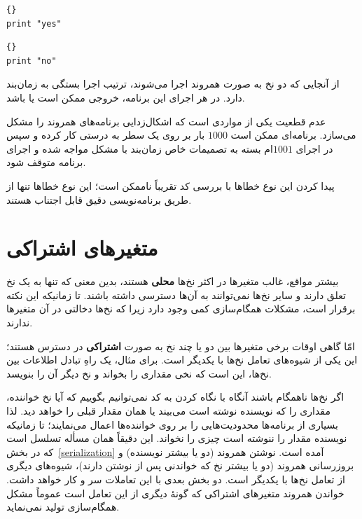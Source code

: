 \documentclass{book}
\begin{document}
\begin{latin}
\begin{minipage}[t]{2in}
\begin{latin}
\begin{lstlisting}[title=\rl{نخ \lr{A}}]{}
print "yes"
\end{lstlisting}
\end{latin}
\end{minipage}
\hfill
\begin{minipage}[t]{2in}
\begin{latin}
\begin{lstlisting}[title=\rl{نخ \lr{‌B}}]{}
print "no"
\end{lstlisting}
\end{latin}
\end{minipage}
\end{latin}

    از آنجایی که دو نخ به صورت همروند اجرا می‌شوند، ترتیب اجرا بستگی به زمان‌بند دارد. در هر اجرای این برنامه، خروجی ممکن است 
      یا 
     باشد. 
     
    عدم قطعیت یکی از مواردی است که اشکال‌زدایی برنامه‌های همروند را مشکل می‌سازد. برنامه‌ای ممکن است $1000$ بار بر روی یک سطر به درستی 
    کار کرده و سپس در اجرای $1001$ام بسته به تصمیمات خاص زمان‌بند با مشکل مواجه شده و اجرای برنامه متوقف شود. 
    
    پیدا کردن این نوع خطاها با بررسی کد تقریباً ناممکن است؛  این نوع  خطاها تنها از طریق برنامه‌نویسی دقیق قابل اجتناب هستند. 


\section {متغیرهای اشتراکی}
\label{shared}

    بیشتر مواقع، غالب متغیرها در اکثر نخ‌ها \textbf{محلی} هستند، بدین معنی که تنها به یک نخ تعلق دارند و 
    سایر نخ‌ها نمی‌توانند به آن‌ها دسترسی داشته باشند. تا زمانیکه این نکته برقرار است، مشکلات همگام‌سازی کمی وجود دارد زیرا که 
    نخ‌ها دخالتی در آن متغیرها ندارند. 

    امّا گاهی اوقات برخی متغیرها بین دو یا چند نخ به صورت \textbf{اشتراکی} در دسترس هستند؛ این 
    یکی از شیوه‌های تعامل نخ‌ها با یکدیگر است. برای مثال، یک راهِ  تبادل اطلاعات بین نخ‌ها، این است که نخی مقداری را بخواند و نخ دیگر آن را بنویسد. 
    
    اگر نخ‌ها ناهمگام باشند آنگاه با نگاه کردن به کد نمی‌توانیم بگوییم که آیا نخ خواننده، مقداری را که نویسنده نوشته است می‌بیند یا همان مقدار قبلی را خواهد دید. 
    لذا بسیاری از برنامه‌ها محدودیت‌هایی را بر روی خواننده‌ها اعمال می‌نمایند؛ تا زمانیکه نویسنده مقدار را ننوشته است چیزی را نخواند. 
    این دقیقاً همان مسأله تسلسل است که در بخش~\ref{serialization} آمده است. 
    نوشتن همروند (دو یا بیشتر نویسنده) و بروزرسانی همروند (دو یا بیشتر نخ که خواندنی پس از نوشتن دارند)، شیوه‌های دیگری از تعامل 
    نخ‌ها با یکدیگر است. دو بخش بعدی با این تعاملات سر و کار خواهد داشت. خواندن همروند متغیرهای اشتراکی که گونهٔ دیگری از این تعامل است 
    عموماً مشکل همگام‌سازی تولید نمی‌نماید. 
\end{document}

